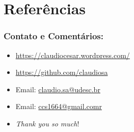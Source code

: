 \documentclass{beamer}
\begin{document}


\section*{Referências}

\begin{frame}
\frametitle{Contato e Comentários:}
  
\begin{block}{}
  \begin{itemize}
  \item \url{https://claudiocesar.wordpress.com/}
   \item \url{https://github.com/claudiosa}
   \item Email: \url{claudio.sa@udesc.br}
    \item Email: \url{ccs1664@gmail.comr}

  \item \textit{Thank you so much}!

  \end{itemize}
  \end{block}

\end{frame}


\end{document}
